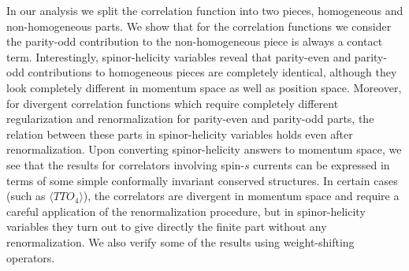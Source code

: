 \documentclass[a4paper,11pt]{article}
\begin{document}
In our analysis we split the correlation function into two pieces, homogeneous and non-homogeneous parts.
 We show that for the correlation functions we consider the parity-odd contribution to the non-homogeneous piece is always a contact term. Interestingly, spinor-helicity variables reveal that parity-even and parity-odd contributions to homogeneous pieces are completely identical, although they look completely different in momentum space as well as position space. Moreover, for divergent correlation functions which require completely different regularization and renormalization for parity-even and parity-odd parts, the relation between these parts in spinor-helicity variables holds even after renormalization. Upon converting spinor-helicity answers to momentum space, we see that the results for correlators involving spin-$s$ currents can be expressed in terms of some simple conformally invariant conserved structures. In certain cases (such as $\langle TTO_4\rangle$), the correlators are divergent in momentum space and require a careful application of the renormalization procedure, but in spinor-helicity variables they turn out to give directly the finite part without any renormalization. We also verify some of the results using weight-shifting operators.
 
\end{document}
